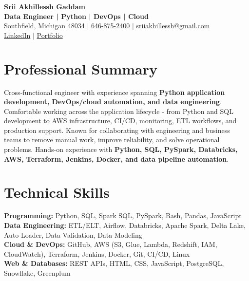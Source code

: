 \documentclass[letterpaper,10pt]{article}
\begin{document}
\fontsize{9.35pt}{10.45pt}\selectfont

\begin{center}
    {\LARGE \textbf{Srii Akhillessh Gaddam}} \\[-1pt]
    \textbf{Data Engineer | Python | DevOps | Cloud} \\[2pt]
    Southfield, Michigan 48034 $|$
    \href{tel:6468752400}{646-875-2400} $|$
    \href{mailto:sriiakhillessh@gmail.com}{sriiakhillessh@gmail.com} \\[1pt]
    \href{https://www.linkedin.com/in/srii-akhiilessh-gaddam-b48668191/}{LinkedIn} $|$
    \href{https://sriiakhillesshg.github.io/portfolio/}{Portfolio}
\end{center}
\vspace{-8pt}

\section{Professional Summary}
\small{Cross-functional engineer with experience spanning \textbf{Python application development, DevOps/cloud automation, and data engineering}. Comfortable working across the application lifecycle - from Python and SQL development to AWS infrastructure, CI/CD, monitoring, ETL workflows, and production support. Known for collaborating with engineering and business teams to remove manual work, improve reliability, and solve operational problems. Hands-on experience with \textbf{Python, SQL, PySpark, Databricks, AWS, Terraform, Jenkins, Docker, and data pipeline automation}.}

\section{Technical Skills}
\small{
\textbf{Programming:} Python, SQL, Spark SQL, PySpark, Bash, Pandas, JavaScript \\
\textbf{Data Engineering:} ETL/ELT, Airflow, Databricks, Apache Spark, Delta Lake, Auto Loader, Data Validation, Data Modeling \\
\textbf{Cloud \& DevOps:} GitHub, AWS (S3, Glue, Lambda, Redshift, IAM, CloudWatch), Terraform, Jenkins, Docker, Git, CI/CD, Linux \\
\textbf{Web \& Databases:} REST APIs, HTML, CSS, JavaScript, PostgreSQL, Snowflake, Greenplum
}

\end{document}
